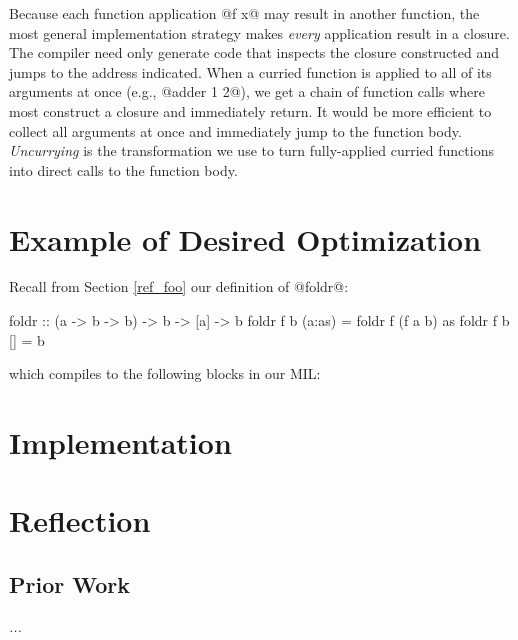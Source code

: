 \documentclass[12pt]{report}
\begin{document}
Because each function application @f x@ may result in another
function, the most general implementation strategy makes \emph{every}
application result in a closure. The compiler need only generate code
that inspects the closure constructed and jumps to the address
indicated. When a curried function is applied to all of its arguments
at once (e.g., @adder 1 2@), we get a chain of function calls where
most construct a closure and immediately return. It would be more
efficient to collect all arguments at once and immediately jump to the
function body. \emph{Uncurrying} is the transformation we use to turn 
fully-applied curried functions into direct calls to the function body.



\section{Example of Desired Optimization}

Recall from Section \ref{ref_foo} our definition of @foldr@:

\begin{code}
foldr :: (a -> b -> b) -> b -> [a] -> b
foldr f b (a:as) = foldr f (f a b) as
foldr f b []     = b
\end{code}

which compiles to the following blocks in our MIL:

\begin{code}

\end{code}

\section{Implementation}
\section{Reflection}
\subsection{Prior Work}
\emph{...}
\end{document}
